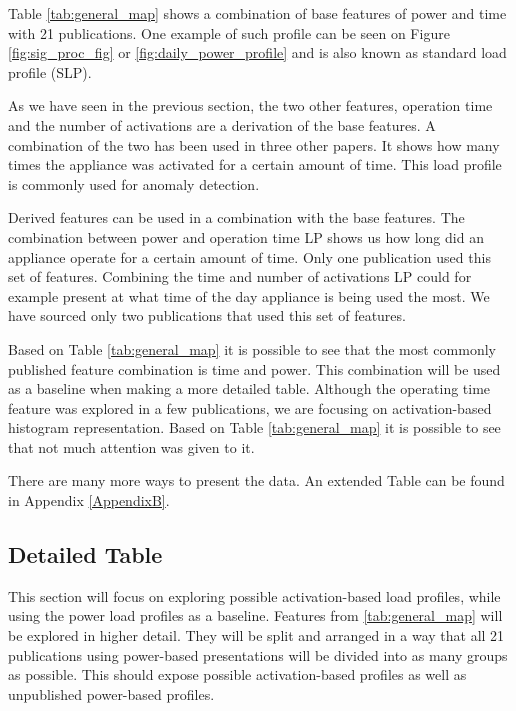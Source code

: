\begin{table}[H]
\begin{tabular}{|c|c|c|c|c|c|}
    \end{tabular}
\end{table}

Table \ref{tab:general_map} shows a combination of base features of power and time with 21 publications. 
One example of such profile can be seen on Figure \ref{fig:sig_proc_fig} or \ref{fig:daily_power_profile} and is also known as standard load profile (SLP).

As we have seen in the previous section, the two other features, operation time and the number of activations are a derivation of the base features.
A combination of the two has been used in three other papers.
It shows how many times the appliance was activated for a certain amount of time. 
This load profile is commonly used for anomaly detection.

Derived features can be used in a combination with the base features.
The combination between power and operation time LP shows us how long did an appliance operate for a certain amount of time.
Only one publication used this set of features.
Combining the time and number of activations LP could for example present at what time of the day appliance is being used the most.
We have sourced only two publications that used this set of features.

Based on Table \ref{tab:general_map} it is possible to see that the most commonly
published feature combination is time and power. This combination will be used 
as a baseline when making a more detailed table. Although the operating time feature was 
explored in a few publications, we are focusing on activation-based histogram representation.
Based on Table \ref{tab:general_map} it is possible to see that not much attention was given to it. 

There are many more ways to present the data. An extended Table can be found in Appendix \ref{AppendixB}.

\subsection{Detailed Table}

This section will focus on exploring possible activation-based load profiles,
while using the power load profiles as a baseline. 
Features from \ref{tab:general_map} will be explored in higher detail. 
They will be split and arranged in a way that all 21 publications using power-based presentations will be divided into as many groups as possible. 
This should expose possible activation-based profiles as well as unpublished power-based profiles.


